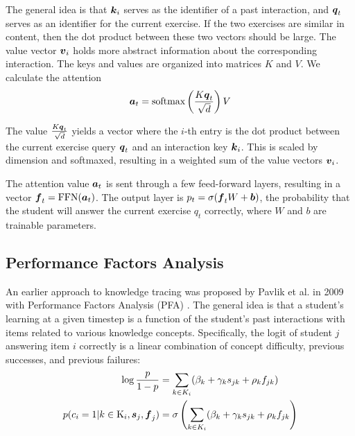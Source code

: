 The general idea is that $\boldsymbol{k}_i$ serves as the identifier of a past interaction, and $\boldsymbol{q}_t$ serves as an identifier for the current exercise. If the two exercises are similar in content, then the dot product between these two vectors should be large. The value vector $\boldsymbol{v}_i$ holds more abstract information about the corresponding interaction. The keys and values are organized into matrices $K$ and $V$. We calculate the attention
\begin{equation}
  \boldsymbol{a}_{t} = \text{softmax}\left(\frac{K \boldsymbol{q}_t}{\sqrt{d}} \right) V
  \label{eq:attn_sakt}
\end{equation}

The value $\frac{K \boldsymbol{q}_t}{\sqrt{d}}$ yields a vector where the $i$-th entry is the dot product between the current exercise query $\boldsymbol{q}_t$ and an interaction key $\boldsymbol{k}_i$. This is scaled by dimension and softmaxed, resulting in a weighted sum of the value vectors $\boldsymbol{v}_i$.

The attention value $\boldsymbol{a}_t$ is sent through a few feed-forward layers, resulting in a vector $\boldsymbol{f}_t = \text{FFN}(\boldsymbol{a}_t)$. The output layer is $p_t = \sigma(\boldsymbol{f}_t W + \boldsymbol{b})$, the probability that the student will answer the current exercise $q_t$ correctly, where $W$ and $b$ are trainable parameters.


\subsection{Performance Factors Analysis}
An earlier approach to knowledge tracing was proposed by Pavlik et al. in 2009 with Performance Factors Analysis (PFA) \cite{pavlik2009}. The general idea is that a student's learning at a given timestep is a function of the student's past interactions with items related to various knowledge concepts. Specifically, the logit of student $j$ answering item $i$ correctly is a linear combination of concept difficulty, previous successes, and previous failures:
\begin{equation}
  \begin{split}
    \log \frac{p}{1-p} &= \sum_{k \in K_i}(\beta_k + \gamma_k s_{jk} + \rho_k f_{jk}) \\
  p(c_i = 1 | k\in \text{K}_i, \boldsymbol{s}_j, \boldsymbol{f}_j) &= \sigma\left(\sum_{k \in K_i}(\beta_k + \gamma_k s_{jk} + \rho_k f_{jk}\right)
  \end{split}
  \label{eq:pfa}
\end{equation}

